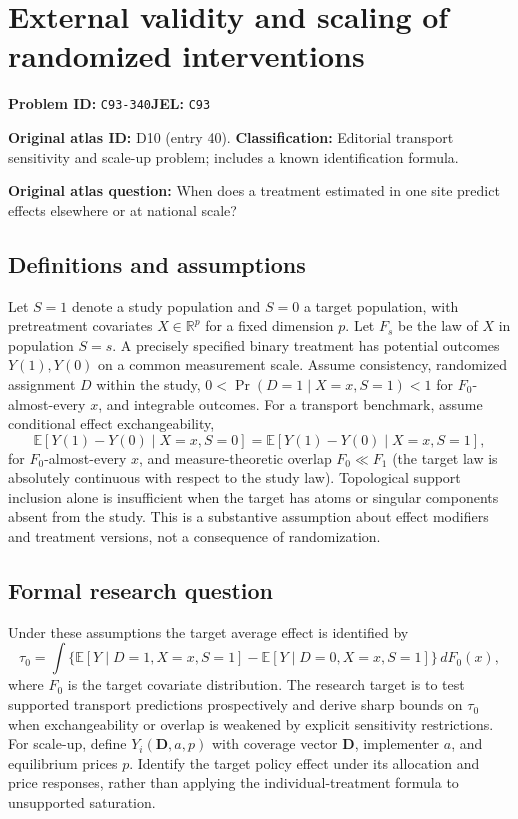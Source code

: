 \documentclass[11pt,a4paper]{article}
\begin{document}
\section*{External validity and scaling of randomized interventions}
\textbf{Problem ID:} \texttt{C93-340}\quad \textbf{JEL:} \texttt{C93}\par
\label{problem:OP-0040}
\label{audited:ECON-018}

\label{atlas:prob:D10}
\noindent\textbf{Original atlas ID:} D10 (entry 40). \textbf{Classification:} Editorial transport sensitivity and scale-up problem; includes a known identification formula.

\noindent\textbf{Original atlas question:} When does a treatment estimated in one site predict effects elsewhere or at national scale?

\subsection*{Definitions and assumptions}
Let $S=1$ denote a study population and $S=0$ a target population, with pretreatment covariates $X\in\mathbb R^p$ for a fixed dimension $p$. Let $F_s$ be the law of $X$ in population $S=s$. A precisely specified binary treatment has potential outcomes $Y(1),Y(0)$ on a common measurement scale. Assume consistency, randomized assignment $D$ within the study, $0<\Pr(D=1\mid X=x,S=1)<1$ for $F_0$-almost-every $x$, and integrable outcomes. For a transport benchmark, assume conditional effect exchangeability,
\[
 \mathbb E[Y(1)-Y(0)\mid X=x,S=0]
 =\mathbb E[Y(1)-Y(0)\mid X=x,S=1],
\]
for $F_0$-almost-every $x$, and measure-theoretic overlap $F_0\ll F_1$ (the target law is absolutely continuous with respect to the study law). Topological support inclusion alone is insufficient when the target has atoms or singular components absent from the study. This is a substantive assumption about effect modifiers and treatment versions, not a consequence of randomization.
\subsection*{Formal research question}
Under these assumptions the target average effect is identified by
\[
 \tau_0=\int\!\bigl\{\mathbb E[Y\mid D=1,X=x,S=1]
                -\mathbb E[Y\mid D=0,X=x,S=1]\bigr\}\,dF_0(x),
\]
where $F_0$ is the target covariate distribution. The research target is to test supported transport predictions prospectively and derive sharp bounds on $\tau_0$ when exchangeability or overlap is weakened by explicit sensitivity restrictions. For scale-up, define $Y_i(\mathbf D,a,p)$ with coverage vector $\mathbf D$, implementer $a$, and equilibrium prices $p$. Identify the target policy effect under its allocation and price responses, rather than applying the individual-treatment formula to unsupported saturation.
\end{document}
